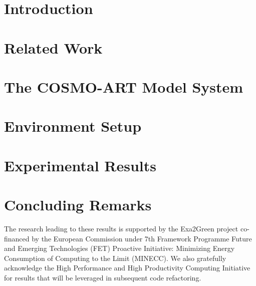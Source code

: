 \documentclass[twocolumn]{svjour3}
\DeclareRobustCommand\IPCClongname{}
\begin{document}
\section{Introduction}
\label{intro}


\section{Related Work}
\label{sec:1}


\section{The \textsc{COSMO-ART} Model System}
\label{sec:2}


\section{Environment Setup}
\label{sec:3}


\section{Experimental Results}
\label{sec:4}


\section{Concluding Remarks}
\label{concl}



\begin{acknowledgements}
The research  leading to these  results is supported by  the Exa2Green
project  co-financed by  the European  Commission under  7th Framework
Programme Future and Emerging Technologies (FET) Proactive Initiative:
Minimizing Energy  Consumption of Computing to the  Limit (MINECC). We
also gratefully acknowledge the High Performance and High Productivity
Computing Initiative \cite{HP2C} for results that will be leveraged in
subsequent code refactoring.
\end{acknowledgements}

\DeclareRobustCommand\IPCClongname{ - Intergovernmental Panel on Climate Change}



\end{document}
